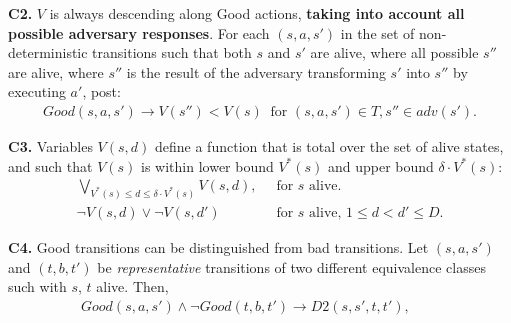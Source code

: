 \documentclass[a4paper]{article}
\newcommand{\smallpar}[1]{{\vspace{10pt}\noindent \bf #1.}}
\newcommand{\badtx}{\ensuremath{\mathrm{BAD}}}
\begin{document}
\smallpar{C2} $V$ is always descending along Good actions, \textbf{taking into account all possible adversary responses}. For each $(s, a, s')$ in the set of non-deterministic transitions such that both $s$ and $s'$ are alive, where all possible $s''$ are alive, where $s''$ is the result of the adversary transforming $s'$ into $s''$ by executing $a'$, post:
\begin{align*}
Good(s, a, s') \rightarrow V(s'') < V(s)  \;\; \text{for } (s, a, s') \in T,  s'' \in adv(s').
\end{align*}




\smallpar{C3}
Variables $V(s, d)$ define a function that is total over the set of alive states,
and such that $V(s)$ is within lower bound $V^*(s)$ and upper bound $\delta \cdot V^*(s)$:
\begin{align*}
 \bigvee_{V^*(s) \leq d \leq \delta \cdot V^*(s)} V(s,d),&\;\; \text{for $s$ alive.} \\
 \neg V(s, d) \lor \neg V(s, d')&\;\; \text{for $s$ alive, $1 \leq d < d' \leq D$.}
\end{align*}


\smallpar{C4}
Good transitions can be distinguished from bad transitions.
Let $(s, a, s')$ and $(t, b, t')$ be \emph{representative} transitions
of two different equivalence classes such with $s$, $t$ alive. Then,
\begin{align*}
 Good(s, a, s') \land \neg Good(t, b, t') \rightarrow
 D2(s, s', t, t'),&\;\; \text{  }
\end{align*}
\end{document}
